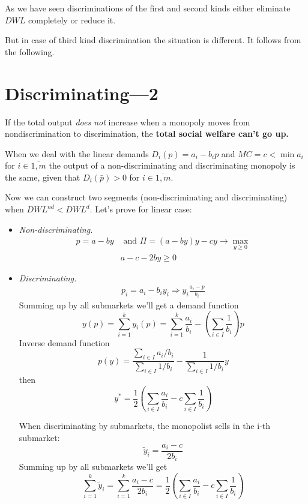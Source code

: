 \documentclass[a4paper, 10pt]{article}
\begin{document}
As we have seen discriminations of the first and second kinds either eliminate $DWL$ completely or reduce it.

But in case of third kind discrimination the situation is different. It follows from the following.


\section{Discriminating—2}
\corollary If the total output \textit{does not} increase when a monopoly moves from nondiscrimination to discrimination, the \textbf{total social welfare can't go up.}

When we deal with the linear demands $D_i(p)=a_i-b_i p$ and $M C=c<\min a_i$ for $i \in \overline{1, m}$ the output of a non-discriminating and discriminating monopoly is the same, given that $D_i(\bar{p})>0$ for $i \in \overline{1, m}$.

Now we can construct two segments (non-discriminating and discriminating) when $D W L^{n d}<D W L^d$. Let's prove for linear case:

\begin{itemize}
    \item \textit{Non-discriminating.} 
    \begin{equation*}
        \begin{aligned}
            p=a-by &\text{ and }\Pi=(a-by)y-cy\longrightarrow\max\limits_{y\geqslant0}\\
            &a-c-2by\geqslant0
        \end{aligned}
    \end{equation*}
    \item \textit{Discriminating.}
    \begin{equation*}
        \begin{aligned}
            p_i=a_i-b_iy_i\Longrightarrow y_i\frac{a_i-p}{b_i}
        \end{aligned}
    \end{equation*}
    Summing up by all submarkets we'll get a demand function
    $$y(p)=\sum_{i=1}^k y_i(p)=\sum_{i=1}^k \frac{a_i}{b_i}-\left(\sum_{i \in I} \frac{1}{b_i}\right) p$$
    Inverse demand function
    $$p(y)=\frac{\sum_{i \in I} a_i / b_i}{\sum_{i \in I} 1 / b_i}-\frac{1}{\sum_{i \in I} 1 / b_i} y$$
    then
    $$y^*=\frac{1}{2}\left(\sum_{i \in I} \frac{a_i}{b_i}-c \sum_{i \in I} \frac{1}{b_i}\right)$$

    When discriminating by submarkets, the monopolist sells in the i-th submarket:
    $$\tilde{y}_i=\frac{a_i-c}{2 b_i}$$
    Summing up by all submarkets we'll get
    $$\sum_{i=1}^k \tilde{y}_i=\sum_{i=1}^k \frac{a_i-c}{2 b_i}=\frac{1}{2}\left(\sum_{i \in I} \frac{a_i}{b_i}-c \sum_{i \in I} \frac{1}{b_i}\right)$$
\end{itemize}
\end{document}
